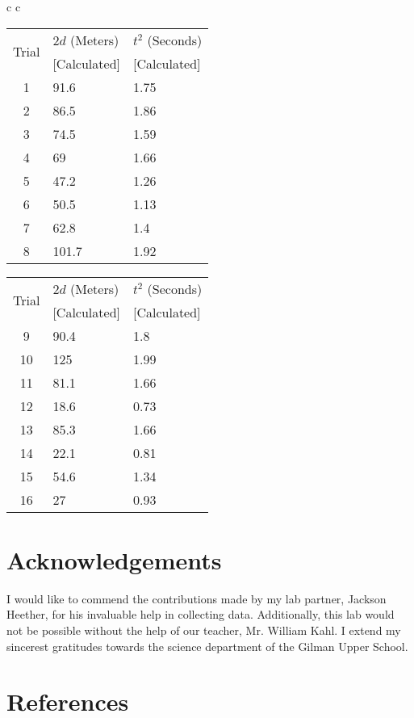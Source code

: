 \documentclass{article}
\begin{document}
\def\arraystretch{1.2}%
\begin{center}
    \begin{tabular}{c c}
        \begin{tabular}{ | c l l | }
            \hline
            \multirow{2}{2em}{Trial} & $2d$ (Meters) & $t^2$ (Seconds)\\
                                 & [Calculated] & [Calculated]\\
            \hline
            1 & 91.6  & 1.75\\
            2 & 86.5  & 1.86\\
            3 & 74.5  & 1.59\\
            4 & 69    & 1.66\\
            5 & 47.2  & 1.26\\
            6 & 50.5  & 1.13\\
            7 & 62.8  & 1.4\\
            8 & 101.7 &	1.92\\
            \hline
        \end{tabular}

        \begin{tabular}{ | c l l | }
            \hline
            \multirow{2}{2em}{Trial} & $2d$ (Meters) & $t^2$ (Seconds)\\
                                 & [Calculated] & [Calculated]\\
            \hline
            9 & 90.4  & 1.8\\
            10 & 125  & 1.99\\
            11 & 81.1 & 1.66\\
            12 & 18.6 & 0.73\\
            13 & 85.3 & 1.66\\
            14 & 22.1 & 0.81\\
            15 & 54.6 & 1.34\\
            16 & 27   & 0.93\\
            \hline
        \end{tabular}
    \end{tabular}
\end{center}

\section{Acknowledgements}
I would like to commend the contributions made by my lab partner, Jackson Heether, for his invaluable help in collecting data. Additionally, this lab would not be possible without the help of our teacher, Mr. William Kahl. I extend my sincerest gratitudes towards the science department of the Gilman Upper School.

\section{References}
\end{document}
